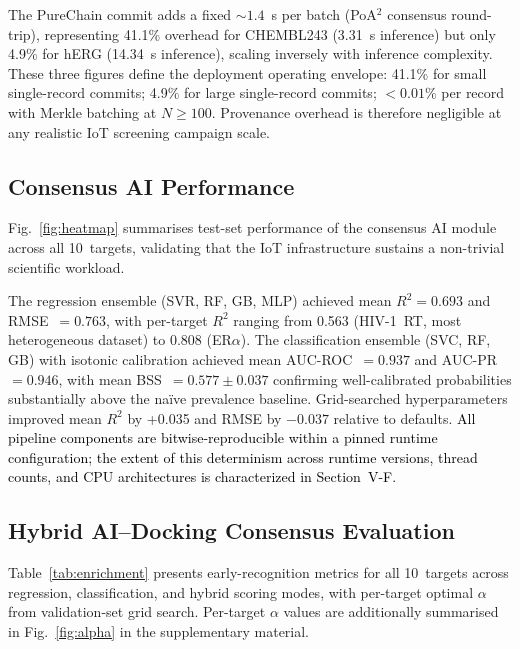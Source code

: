 \documentclass[conference]{IEEEtran}
\begin{document}
The PureChain commit adds a fixed ${\sim}1.4$~s per batch
(PoA$^2$ consensus round-trip), representing 41.1\%
overhead for CHEMBL243 (3.31~s inference) but only 4.9\%
for hERG (14.34~s inference), scaling inversely with
inference complexity.
These three figures define the deployment operating
envelope: 41.1\% for small single-record commits;
4.9\% for large single-record commits; $<0.01\%$
per record with Merkle batching at $N{\geq}100$.
Provenance overhead is therefore negligible at any
realistic IoT screening campaign scale.


\subsection{\textbf{Consensus AI Performance}}
\label{sec:ai-results}

Fig.~\ref{fig:heatmap} summarises test-set performance of
the consensus AI module across all 10~targets, validating
that the IoT infrastructure sustains a non-trivial
scientific workload.



The regression ensemble (SVR, RF, GB, MLP) achieved mean
$R^2{=}0.693$ and RMSE~$=0.763$, with per-target $R^2$
ranging from 0.563 (HIV-1~RT, most heterogeneous dataset)
to 0.808 (ER$\alpha$).
The classification ensemble (SVC, RF, GB) with isotonic
calibration achieved mean AUC-ROC~$=0.937$ and
AUC-PR~$=0.946$, with mean BSS~$=0.577{\pm}0.037$
confirming well-calibrated probabilities substantially
above the na\"ive prevalence baseline.
Grid-searched hyperparameters improved mean $R^2$ by +0.035 and RMSE by
$-0.037$ relative to defaults. \textcolor{black}{All pipeline components are
bitwise-reproducible within a pinned runtime configuration; the extent of
this determinism across runtime versions, thread counts, and CPU
architectures is characterized in Section~V-F.}


\subsection{\textbf{Hybrid AI--Docking Consensus Evaluation}}
\label{sec:hybrid-results}

Table~\ref{tab:enrichment} presents early-recognition
metrics for all 10~targets across regression,
classification, and hybrid scoring modes, with per-target
optimal $\alpha$ from validation-set grid search.
Per-target $\alpha$ values are additionally summarised
in Fig.~\ref{fig:alpha} in the supplementary material.
\end{document}
